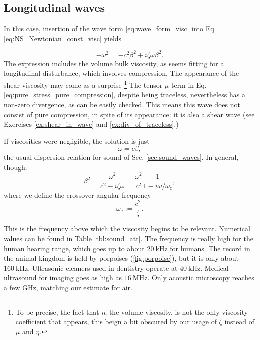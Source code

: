 \subsection{Longitudinal waves}

In this case, insertion of the wave form \ref{eq:wave_form_visc} into
Eq. \ref{eq:NS_Newtonian_const_visc} yields

\begin{equation}
  -\omega^2 = - c^2\beta^2 + i \zeta  \omega \beta^2 .
\end{equation}
The expression includes the volume bulk viscosity, as seems fitting
for a longitudinal disturbance, which involves compression.  The
appearance of the shear viscosity may come as a surprise \footnote{%
  To be precise, the fact that $\eta$, the volume viscosity, is not
  the only viscosity coefficient that appears, this beign a bit
  obscured by our usage of $\zeta$ instead of $\mu$ and $\eta$.}  The
tensor $\mu$ term in Eq. \ref{eq:pure_stress_pure_compression},
despite being traceless, nevertheless has a non-zero divergence, as
can be easily checked.  This means this wave does not consist of pure
compression, in spite of its appearance: it is also a shear wave (see
Exercises \ref{ex:shear_in_wave} and \ref{ex:div_of_traceless}.)


If viscosities were negligible, the solution is just
\[
\omega =  c \beta ,
\]
%
the usual dispersion relation for sound of
Sec. \ref{sec:sound_waves}. In general, though:
\begin{equation}
  \label{eq:waves_att_dispersion}
  \beta^2 =
  \frac{\omega^2}{c^2 - i \zeta\omega}=
  \frac{\omega^2}{c^2}\frac{1}{1 -  i\omega/\omega_\mathrm{c}},
\end{equation}
where we define the crossover angular frequency 
\[
  \omega_\mathrm{c} := \frac{c^2}{ \zeta }.
\]

This is the frequency above which the viscosity begins to be relevant.
Numerical values can be found in Table \ref{tbl:sound_att}. The
frequency is really high for the human hearing range, which goes up to
about $\SI{20}{\kilo\hertz}$ for humans. The record in the animal
kingdom is held by porpoises (\ref{fig:porpoise}), but it is only
about $\SI{160}{\kilo\hertz}$. Ultrasonic cleaners used in dentistry
operate at $\SI{40}{\kilo\hertz}$. Medical ultrasound for imaging goes
as high as $\SI{16}{\mega\hertz}$. Only acoustic microscopy
\cite{kp:AM} reaches a few \si{\giga\hertz}, matching our estimate for
air.


